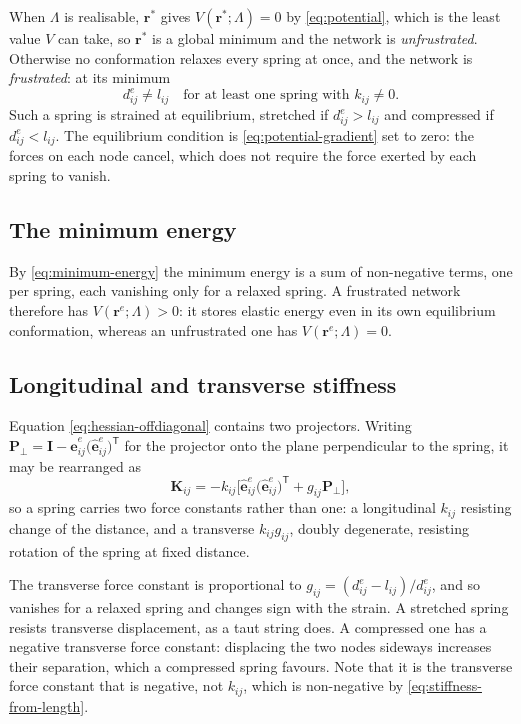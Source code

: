 \documentclass[11pt]{article}
\newcommand{\rr}{\mathbf{r}}
\newcommand{\ee}{\hat{\mathbf{e}}}
\newcommand{\KK}{\mathbf{K}}
\newcommand{\LL}{\Lambda}
\newcommand{\re}{\rr^{e}}
\newcommand{\eeije}{\ee^{e}_{ij}}
\newcommand{\dije}{d^{e}_{ij}}
\newcommand{\gij}{g_{ij}}
\newcommand{\lij}{l_{ij}}
\newcommand{\kij}{k_{ij}}
\begin{document}
When $\LL$ is realisable, $\rr^{\ast}$ gives $V(\rr^{\ast};\LL) = 0$ by \eqref{eq:potential}, which is the least value $V$ can take, so $\rr^{\ast}$ is a global minimum and the network is \emph{unfrustrated}.
Otherwise no conformation relaxes every spring at once, and the network is \emph{frustrated}: at its minimum
\begin{equation}
\dije \ne \lij \quad \text{for at least one spring with } \kij \ne 0 .
\label{eq:frustration}
\end{equation}
Such a spring is strained at equilibrium, stretched if $\dije > \lij$ and compressed if $\dije < \lij$.
The equilibrium condition is \eqref{eq:potential-gradient} set to zero: the forces on each node cancel, which does not require the force exerted by each spring to vanish.

\subsection*{The minimum energy}

By \eqref{eq:minimum-energy} the minimum energy is a sum of non-negative terms, one per spring, each vanishing only for a relaxed spring.
A frustrated network therefore has $V(\re;\LL) > 0$: it stores elastic energy even in its own equilibrium conformation, whereas an unfrustrated one has $V(\re;\LL) = 0$.

\subsection*{Longitudinal and transverse stiffness}

Equation \eqref{eq:hessian-offdiagonal} contains two projectors. Writing
$\mathbf{P}_\perp = \mathbf{I} - \eeije\big(\eeije\big)^{\mathsf T}$ for the projector
onto the plane perpendicular to the spring, it may be rearranged as
\begin{equation}
\KK_{ij} = -\kij\Big[\eeije\big(\eeije\big)^{\mathsf T}
+ \gij\mathbf{P}_\perp\Big],
\label{eq:hessian-longitudinal-transverse}
\end{equation}
so a spring carries two force constants rather than one: a longitudinal $\kij$
resisting change of the distance, and a transverse $\kij \gij$, doubly
degenerate, resisting rotation of the spring at fixed distance.

The transverse force constant is proportional to $\gij = (\dije - \lij)/\dije$, and so
vanishes for a relaxed spring and changes sign with the strain. A stretched spring
resists transverse displacement, as a taut string does. A
compressed one has a negative transverse force constant: displacing the two nodes
sideways increases their separation, which a compressed spring favours. Note that
it is the transverse force constant that is negative, not $\kij$, which is
non-negative by \eqref{eq:stiffness-from-length}.
\end{document}
